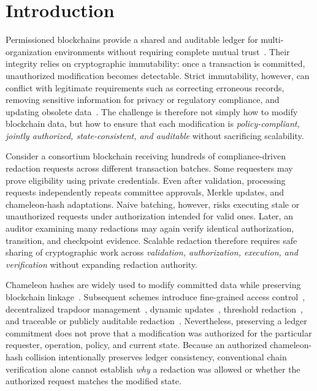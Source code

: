 \documentclass[lettersize,journal]{IEEEtran}
\begin{document}
\section{Introduction}

Permissioned blockchains provide a shared and auditable ledger for
multi-organization environments without requiring complete mutual
trust~\cite{ref7}. Their integrity relies on cryptographic immutability:
once a transaction is committed, unauthorized modification becomes
detectable. Strict immutability, however, can conflict with legitimate
requirements such as correcting erroneous records, removing sensitive
information for privacy or regulatory compliance, and updating obsolete
data~\cite{ref9,ref21,ref22,ref38}. The challenge is therefore not
simply how to modify blockchain data, but how to ensure that each
modification is \emph{policy-compliant, jointly authorized,
state-consistent, and auditable} without sacrificing scalability.

Consider a consortium blockchain receiving hundreds of compliance-driven
redaction requests across different transaction batches. Some requesters
may prove eligibility using private credentials. Even after validation,
processing requests independently repeats committee approvals, Merkle
updates, and chameleon-hash adaptations. Naive batching, however, risks
executing stale or unauthorized requests under authorization intended
for valid ones. Later, an auditor examining many redactions may again
verify identical authorization, transition, and checkpoint evidence.
Scalable redaction therefore requires safe sharing of cryptographic work
across \emph{validation, authorization, execution, and verification}
without expanding redaction authority.

Chameleon hashes are widely used to modify committed data while
preserving blockchain linkage~\cite{ref1,ref2,ref6}. Subsequent
schemes introduce fine-grained access control~\cite{ref8,ref15},
decentralized trapdoor management~\cite{ref3,ref19}, dynamic
updates~\cite{ref5,ref16}, threshold redaction~\cite{ref27}, and
traceable or publicly auditable redaction~\cite{ref33,ref34,ref35}.
Nevertheless, preserving a ledger commitment does not prove that a
modification was authorized for the particular requester, operation,
policy, and current state. Because an authorized chameleon-hash
collision intentionally preserves ledger consistency, conventional
chain verification alone cannot establish \emph{why} a redaction was
allowed or whether the authorized request matches the modified state.
\end{document}
